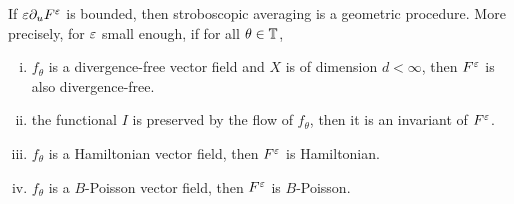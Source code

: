 \begin{theorem} \label{sec:geometry:thm:conservation}
  If $\varepsilon \partial_u F^{\varepsilon}$ is bounded, then stroboscopic averaging is a
  geometric procedure. More precisely, for $\varepsilon$ small enough, if for all
  $\theta \in \mathbb{T}$, 
  \begin{enumerate}[(i)]
    \item $f_\theta$ is a divergence-free vector field and $X$ is of
    dimension $d < \infty$, then $F^{\varepsilon}$ is also divergence-free.
    \item the functional $I$ is preserved by the flow of $f_\theta$,
    then it is an invariant of $F^{\varepsilon}$.
    \item $f_\theta$ is a Hamiltonian vector field, then $F^{\varepsilon}$ is
    Hamiltonian.
    \item $f_\theta$ is a $B$-Poisson vector field, then $F^{\varepsilon}$ is
    $B$-Poisson.
  \end{enumerate}
\end{theorem}
